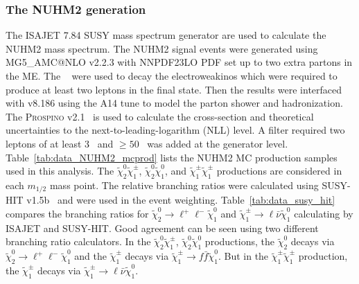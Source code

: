 \subsubsection{The NUHM2 generation}
\label{subsubsec:data_NUHM2_generation}
The \textsc{ISAJET} 7.84 SUSY mass spectrum generator are used to calculate the NUHM2 mass spectrum.
The NUHM2 signal events were generated using MG5\_{\scriptsize A}MC@NLO v2.2.3 with NNPDF23LO PDF set up to two extra partons in the ME.
The {\MADSPIN}~\cite{Artoisenet:2012st} were used to decay the electroweakinos which were required to produce at least two leptons in the final state.
Then the results were interfaced with {\PYTHIA} v8.186 using the A14 tune to model the parton shower and hadronization.
The \textsc{Prospino} v2.1~\cite{Beenakker:1996ed} is used to calculate the cross-section and theoretical uncertainties to the next-to-leading-logarithm (NLL) level.
A filter required two leptons of at least 3~{\GeV} and \met $\ge 50$~{\GeV} was added at the generator level.
Table~\ref{tab:data_NUHM2_mcprod} lists the NUHM2 MC production samples used in this analysis.
The $\widetilde{\chi}^{0}_{2} \widetilde{\chi}^{\pm}_{1}$, $\widetilde{\chi}^{0}_{2} \widetilde{\chi}^{0}_{1}$, and $\widetilde{\chi}^{\pm}_{1} \widetilde{\chi}^{\pm}_{1}$ productions are considered in each $m_{1/2}$ mass point.
The relative branching ratios were calculated using SUSY-HIT v1.5b~\cite{Djouadi:2006bz} and were used in the event weighting.
Table~\ref{tab:data_susy_hit} compares the branching ratios for $\widetilde{\chi}^{0}_{2} \to \ell^{+} \ell^{-} \widetilde{\chi}^{0}_{1}$ and $\widetilde{\chi}^{\pm}_{1} \to \ell \bar{\nu} \widetilde{\chi}^{0}_{1}$ calculating by \textsc{ISAJET} and SUSY-HIT.
Good agreement can be seen using two different branching ratio calculators.
In the $\widetilde{\chi}^{0}_{2} \widetilde{\chi}^{\pm}_{1}$, $\widetilde{\chi}^{0}_{2} \widetilde{\chi}^{0}_{1}$ productions, the $\widetilde{\chi}^{0}_{2}$ decays via $\widetilde{\chi}^{0}_{2} \to \ell^{+} \ell^{-} \widetilde{\chi}^{0}_{1}$ and the $\widetilde{\chi}^{\pm}_{1}$ decays via $\widetilde{\chi}^{\pm}_{1} \to f\bar{f} \widetilde{\chi}^{0}_{1}$.
But in the $\widetilde{\chi}^{\pm}_{1} \widetilde{\chi}^{\pm}_{1}$ production, the $\widetilde{\chi}^{\pm}_{1}$ decays via $\widetilde{\chi}^{\pm}_{1} \to \ell \bar{\nu} \widetilde{\chi}^{0}_{1}$.

